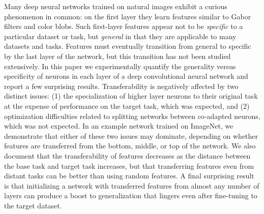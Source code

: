 
Many deep neural networks trained on natural images exhibit a curious
phenomenon in common: on the first layer they learn features similar
to Gabor filters and color blobs.  Such first-layer features appear
not to be \emph{specific} to a particular dataset or task, but
\emph{general} in that they are applicable to many datasets and tasks.
Features must eventually transition from general to specific by the
last layer of the network, but this transition has not been studied
extensively.  In this paper we experimentally quantify the generality
versus specificity of neurons in each layer of a deep convolutional
neural network and report a few surprising results. Transferability is
negatively affected by two distinct issues: (1) the specialization of
higher layer neurons to their original task at the expense of
performance on the target task, which was expected, and (2)
optimization difficulties related to splitting networks between
co-adapted neurons, which was not expected.  In an example network
trained on ImageNet, we demonstrate that either of these two issues
may dominate, depending on whether features are transferred from the
bottom, middle, or top of the network.  We also document that the
transferability of features decreases as the distance between the base
task and target task increases, but that transferring features even
from distant tasks can be better than using random features. A final
surprising result is that initializing a network with transferred
features from almost any number of layers can produce a boost to
generalization that lingers even after fine-tuning to the target
dataset.



